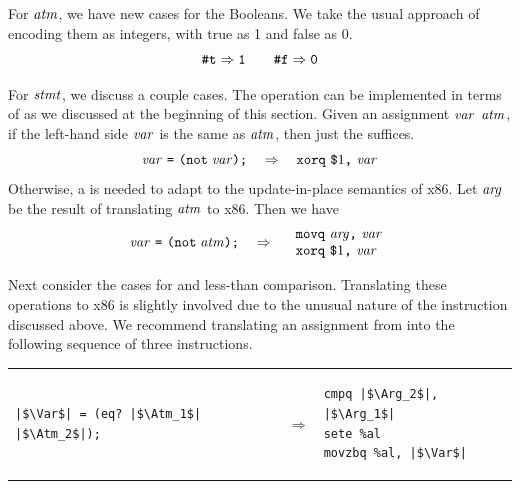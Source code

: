 \documentclass[11pt]{book}
\begin{document}
For $\mathit{atm}$, we have new cases for the Booleans.  We take the usual
approach of encoding them as integers, with true as 1 and false as 0.
\[
\texttt{\#t} \Rightarrow \texttt{1}
\qquad
\texttt{\#f} \Rightarrow \texttt{0}
\]

For $\mathit{stmt}$, we discuss a couple cases.  The  operation can
be implemented in terms of  as we discussed at the
beginning of this section. Given an assignment
$\mathit{var}$ \key{=}  $\mathit{atm}$\key{);},
if the left-hand side $\mathit{var}$ is
the same as $\mathit{atm}$, then just the  suffices.
\[
\mathit{var}~\texttt{=}~ \texttt{(not}\; \mathit{var}\texttt{);}
\quad\Rightarrow\quad
\texttt{xorq}~\texttt{\$}1\texttt{,}~\mathit{var}
\]
Otherwise, a  is needed to adapt to the update-in-place
semantics of x86. Let $\mathit{arg}$ be the result of translating $\mathit{atm}$ to
x86. Then we have
\[
\mathit{var}~\texttt{=}~ \texttt{(not}\; \mathit{atm}\texttt{);}
\quad\Rightarrow\quad
\begin{array}{l}
\texttt{movq}~\mathit{arg}\texttt{,}~\mathit{var}\\
\texttt{xorq}~\texttt{\$}1\texttt{,}~\mathit{var}
\end{array}
\]

Next consider the cases for  and less-than comparison.
Translating these operations to x86 is slightly involved due to the
unusual nature of the  instruction discussed above.  We
recommend translating an assignment from  into the following
sequence of three instructions. \\
\begin{tabular}{lll}
\begin{minipage}{0.4\textwidth}
\begin{lstlisting}
|$\Var$| = (eq? |$\Atm_1$| |$\Atm_2$|);
\end{lstlisting}
\end{minipage}
&
$\Rightarrow$
&
\begin{minipage}{0.4\textwidth}
\begin{lstlisting}
cmpq |$\Arg_2$|, |$\Arg_1$|
sete %al
movzbq %al, |$\Var$|
\end{lstlisting}
\end{minipage}
\end{tabular}  \\
\end{document}
